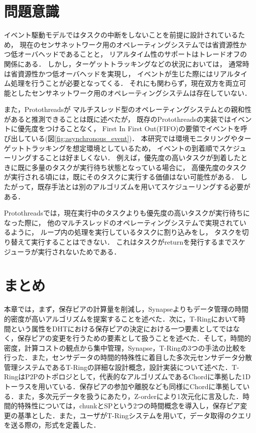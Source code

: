 \section{問題意識}
イベント駆動モデルではタスクの中断をしないことを前提に設計されているため，
現在のセンサネットワーク用のオペレーティングシステムでは省資源性かつ低オーバヘッドであることと，
リアルタイム性のサポートはトレードオフの関係にある．
しかし，ターゲットトラッキングなどの状況においては，
通常時は省資源性かつ低オーバヘッドを実現し，
イベントが生じた際にはリアルタイム処理を行うことが必要となってくる．
それにも関わらず，現在双方を両立可能としたセンサネットワーク用のオペレーティングシステムは存在していない．

また，Protothreadsが
マルチスレッド型のオペレーティングシステムとの親和性があると推測できることは既に述べたが，
既存のProtothreadsの実装ではイベントに優先度をつけることなく，
First In First Out(FIFO)の要領でイベントを呼び出している(図\ref{fig:asynchronous_event})．
本研究では環境モニタリングやターゲットトラッキングを想定環境としているため，
イベントの到着順でスケジューリングすることは好ましくない．
例えば，優先度の高いタスクが到着したときに既に多量のタスクが実行待ち状態となっている場合に，
高優先度のタスクが実行される頃には，既にそのタスクに実行する価値はない可能性がある．
したがって，既存手法とは別のアルゴリズムを用いてスケジューリングする必要がある．



Protothreadsでは，現在実行中のタスクよりも優先度の高いタスクが実行待ちになった際に，
他のマルチスレッドのオペレーティングシステムで実現されているように，
ループ内の処理を実行しているタスクに割り込みをし，
タスクを切り替えて実行することはできない．
これはタスクがreturnを発行するまでスケジューラが実行されないためである．



\section{まとめ}
本章では，まず，保存ピアの計算量を削減し，Synapseよりもデータ管理の時間的密度が高いアルゴリズムを提案することを述べた．次に，T-Ringにおいて時間という属性をDHTにおける保存ピアの決定における一つ要素としてではなく，保存ピアの変更を行うための要素として扱うことを述べた．そして，時間的密度，計算コストの観点から集中管理，Synapse，T-Ringの3つの手法の比較を行った．また，センサデータの時間的特殊性に着目した多次元センサデータ分散管理システムであるT-Ringの詳細な設計概念，設計実装について述べた．T-RingはP2Pのトポロジとして，代表的なアルゴリズムであるChordに準拠した1Dトーラスを用いている．保存ピアの参加や離脱なども同様にChordに準拠している．また，多次元データを扱うにあたり，Z-orderにより1次元化に言及した．時間的特殊性については，chunkとSPという2つの時間概念を導入し，保存ピア変更の基準とした．また，ユーザがT-Ringシステムを用いて，データ取得のクエリを送る際の，形式を定義した．



